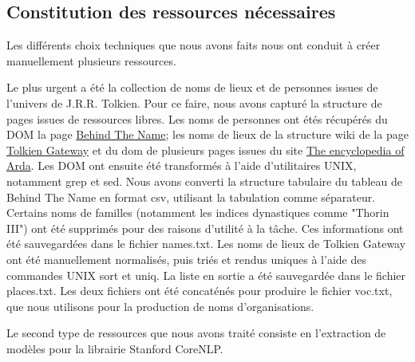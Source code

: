 \documentclass{article}
\begin{document}
\subsection{Constitution des ressources nécessaires}
\par
Les différents choix techniques que nous avons faits nous ont conduit à créer manuellement plusieurs ressources.
\par
Le plus urgent a été la collection de noms de lieux et de personnes issues de l'univers de J.R.R. Tolkien.
Pour ce faire, nous avons capturé la structure de pages issues de ressources libres.
Les noms de personnes ont étés récupérés du DOM la page \href{https://www.behindthename.com/namesakes/list/tolkien/alpha}{Behind The Name}; les noms de lieux de la structure wiki de la page \href{http://tolkiengateway.net/w/index.php?title=List_of_Place_Names}{Tolkien Gateway} et du dom de plusieurs pages issues du site \href{http://www.glyphweb.com/arda/default.asp}{The encyclopedia of Arda}.
Les DOM ont ensuite été transformés à l'aide d'utilitaires UNIX, notamment grep et sed.
Nous avons converti la structure tabulaire du tableau de Behind The Name en format csv, utilisant la tabulation comme séparateur.
Certains noms de familles (notamment les indices dynastiques comme "Thorin III") ont été supprimés pour des raisons d'utilité à la tâche.
Ces informations ont été sauvegardées dans le fichier names.txt.
Les noms de lieux de Tolkien Gateway ont été manuellement normalisés, puis triés et rendus uniques à l'aide des commandes UNIX sort et uniq.
La liste en sortie a été sauvegardée dans le fichier places.txt.
Les deux fichiers ont été concaténés pour produire le fichier voc.txt, que nous utilisons pour la production de noms d'organisations.
\par
Le second type de ressources que nous avons traité consiste en l'extraction de modèles pour la librairie Stanford CoreNLP.
\end{document}
